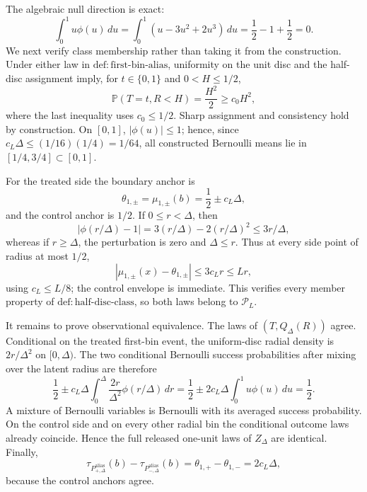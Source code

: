 The algebraic null direction is exact:
\[
 \int_0^1u\phi(u)\,du
 =\int_0^1(u-3u^2+2u^3)\,du
 =\frac12-1+\frac12=0.
\]
We next verify class membership rather than taking it from the construction.  Under either law in \(\mathrm{def:first\text{-}bin\text{-}alias}\), uniformity on the unit disc and the half-disc assignment imply, for \(t\in\{0,1\}\) and \(0<H\le1/2\),
\[
 \mathbb P(T=t,R<H)=\frac{H^2}{2}\ge c_0H^2,
\]
where the last inequality uses \(c_0\le1/2\).  Sharp assignment and consistency hold by construction.  On \([0,1]\), \(|\phi(u)|\le1\); hence, since \(c_L\Delta\le(1/16)(1/4)=1/64\), all constructed Bernoulli means lie in \([1/4,3/4]\subset[0,1]\).

For the treated side the boundary anchor is
\[
 \theta_{1,\pm}=\mu_{1,\pm}(b)=\frac12\pm c_L\Delta,
\]
and the control anchor is \(1/2\).  If \(0\le r<\Delta\), then
\[
 |\phi(r/\Delta)-1|
 =3(r/\Delta)-2(r/\Delta)^2
 \le3r/\Delta,
\]
whereas if \(r\ge\Delta\), the perturbation is zero and \(\Delta\le r\).  Thus at every side point of radius at most \(1/2\),
\[
 |\mu_{1,\pm}(x)-\theta_{1,\pm}|
 \le3c_Lr\le Lr,
\]
using \(c_L\le L/8\); the control envelope is immediate.  This verifies every member property of \(\mathrm{def:half\text{-}disc\text{-}class}\), so both laws belong to \(\mathcal P_L\).

It remains to prove observational equivalence.  The laws of \((T,Q_\Delta(R))\) agree.  Conditional on the treated first-bin event, the uniform-disc radial density is \(2r/\Delta^2\) on \([0,\Delta)\).  The two conditional Bernoulli success probabilities after mixing over the latent radius are therefore
\[
 \frac12\pm c_L\Delta\int_0^\Delta\frac{2r}{\Delta^2}\phi(r/\Delta)\,dr
 =\frac12\pm2c_L\Delta\int_0^1u\phi(u)\,du
 =\frac12.
\]
A mixture of Bernoulli variables is Bernoulli with its averaged success probability.  On the control side and on every other radial bin the conditional outcome laws already coincide.  Hence the full released one-unit laws of \(Z_\Delta\) are identical.  Finally,
\[
 \tau_{P^{\mathrm{alias}}_{+,\Delta}}(b)
 -\tau_{P^{\mathrm{alias}}_{-,\Delta}}(b)
 =\theta_{1,+}-\theta_{1,-}=2c_L\Delta,
\]
because the control anchors agree.